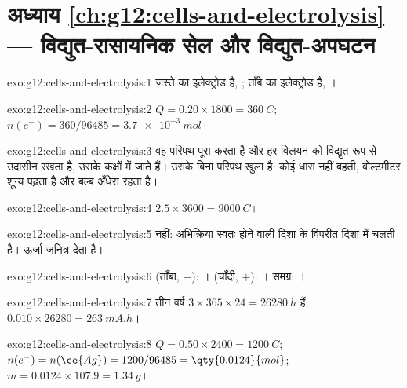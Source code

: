 \section*{अध्याय \ref{ch:g12:cells-and-electrolysis} --- विद्युत-रासायनिक सेल और विद्युत-अपघटन}

\begin{solution}{exo:g12:cells-and-electrolysis:1}
जस्ते का इलेक्ट्रोड  है, ; ताँबे का
इलेक्ट्रोड  है, ।
\end{solution}

\begin{solution}{exo:g12:cells-and-electrolysis:2}
$Q = 0.20 \times 1800 = \qty{360}{C}$; $n(e^-) = 360/96485 =
\qty{3.7e-3}{mol}$।
\end{solution}

\begin{solution}{exo:g12:cells-and-electrolysis:3}
वह परिपथ पूरा करता है और हर विलयन को विद्युत रूप से उदासीन रखता है, उसके
 कक्षों में जाते हैं। उसके बिना परिपथ खुला है: कोई
धारा नहीं बहती, वोल्टमीटर शून्य पढ़ता है और बल्ब अँधेरा रहता है।
\end{solution}

\begin{solution}{exo:g12:cells-and-electrolysis:4}
$2.5 \times 3600 = \qty{9000}{C}$।
\end{solution}

\begin{solution}{exo:g12:cells-and-electrolysis:5}
नहीं: अभिक्रिया स्वतः होने वाली दिशा के विपरीत दिशा में चलती है।
ऊर्जा जनित्र देता है।
\end{solution}

\begin{solution}{exo:g12:cells-and-electrolysis:6}
 (ताँबा, $-$): ।  (चाँदी, $+$):
। समग्र: ।
\end{solution}

\begin{solution}{exo:g12:cells-and-electrolysis:7}
तीन वर्ष $3 \times 365 \times 24 = \qty{26280}{h}$ हैं;
$0.010 \times 26280 = \qty{263}{mA.h}$।
\end{solution}

\begin{solution}{exo:g12:cells-and-electrolysis:8}
$Q = 0.50 \times 2400 = \qty{1200}{C}$; $n(e^-) = n(\ce{Ag}) =
1200/96485 = \qty{0.0124}{mol}$; $m = 0.0124 \times 107.9 =
\qty{1.34}{g}$।
\end{solution}

